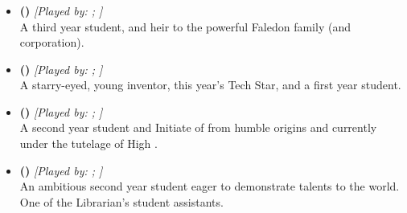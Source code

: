 \documentclass[blue]{GL2020}
\begin{document}
\subsubsection*{\pTech{}}
\begin{itemize}
    \item \textbf{\cHeir{\full} (\cHeir{\MYcharpronouns})} \textit{[Played by: \cHeir{\MYplayer}; \cHeir{\MYplayerpronouns}]}\\ A third year student, and heir to the powerful Faledon family (and corporation).

    \item \textbf{\cTechStar{\full} (\cTechStar{\MYcharpronouns})} \textit{[Played by: \cTechStar{\MYplayer}; \cTechStar{\MYplayerpronouns}]}\\ A starry-eyed, young inventor, this year's Tech Star, and a first year student.

    \item \textbf{\cScholarship{\full} (\cScholarship{\MYcharpronouns})} \textit{[Played by: \cScholarship{\MYplayer}; \cScholarship{\MYplayerpronouns}]}\\ A second year student and Initiate of \cTechGod{} from humble origins and currently under the tutelage of High \cAntiChup{\cleric} \cAntiChup{}.

    \item \textbf{\cAmbition{\full} (\cAmbition{\MYcharpronouns})} \textit{[Played by: \cAmbition{\MYplayer}; \cAmbition{\MYplayerpronouns}]}\\ An ambitious second year student eager to demonstrate \cAmbition{\their} talents to the world. One of the Librarian's student assistants.
    
\end{itemize}
\end{document}
